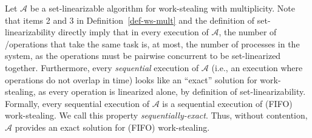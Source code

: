 
Let \(\mathcal A\) be a set-linearizable algorithm for work-stealing with multiplicity.  Note that items 2 and 3 in Definition~\ref{def-ws-mult} and the definition of set-linearizability directly imply that in every execution of \(\mathcal A\), the number of \Take/\Steal operations that take the same task is, at most, the number of processes in the system, as the operations must be pairwise concurrent to be set-linearized together. Furthermore, every \emph{sequential} execution of \(\mathcal A\) (i.e., an execution where operations do not overlap in time) looks like an ``exact'' solution for work-stealing, as every operation is linearized alone, by definition of set-linearizability. Formally, every sequential execution of \(\mathcal A\) is a sequential execution of (FIFO) work-stealing. We call this property \emph{sequentially-exact}.  Thus, without contention, \(\mathcal A\) provides an exact solution for (FIFO) work-stealing.


